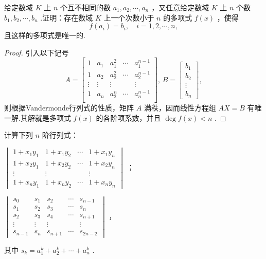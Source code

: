 \begin{prob}[11]
	给定数域 $K$ 上 $n$ 个互不相同的数 $a_1,a_2,\cdots,a_n$ ，又任意给定数域 $K$ 上 $n$ 个数 $b_1,b_2,\cdots,b_n$ .证明：存在数域 $K$ 上一个次数小于 $n$ 的多项式 $f(x)$ ，使得
	\[
		f(a_i)=b_i,\quad i=1,2,\cdots,n,
	\]
	且这样的多项式是唯一的.
\end{prob}
\begin{proof}
	引入以下记号
	\[
		A=\begin{bmatrix}
			1      & a_1    & a_1^2  & \cdots & a_1^{n-1} \\
			1      & a_2    & a_2^2  & \cdots & a_2^{n-1} \\
			\vdots & \vdots & \vdots &        & \vdots    \\
			1      & a_n    & a_2^n  & \cdots & a_n^{n-1} \\
		\end{bmatrix},\,B=\begin{bmatrix}
			b_1 \\b_2\\\vdots\\b_n
		\end{bmatrix},
	\]
	则根据Vandermonde行列式的性质，矩阵 $A$ 满秩，因而线性方程组 $AX=B$ 有唯一解.其解就是多项式 $f(x)$ 的各阶项系数，并且 $\deg f(x)<n$ .
\end{proof}
\begin{prob}[12]
	计算下列 $n$ 阶行列式：
	\begin{mylist}
		\item  $\begin{vmatrix}
				1+x_1y_1 & 1+x_1y_2 & \cdots & 1+x_1y_n \\
				1+x_2y_1 & 1+x_2y_2 & \cdots & 1+x_2y_n \\
				\vdots   & \vdots   &        & \vdots   \\
				1+x_ny_1 & 1+x_ny_2 & \cdots & 1+x_ny_n
			\end{vmatrix}$ ；
		\item  $\begin{vmatrix}
				s_0     & s_1    & s_2     & \cdots & s_{n-1}  \\
				s_1     & s_2    & s_3     & \cdots & s_n      \\
				s_2     & s_3    & s_4     & \cdots & s_{n+1}  \\
				\vdots  & \vdots & \vdots  &        & \vdots   \\
				s_{n-1} & s_n    & s_{n+1} & \cdots & s_{2n-2}
			\end{vmatrix}$ ，\par
		其中 $s_k=a_1^k+a_2^k+\cdots+a_n^k$ .
	\end{mylist}
\end{prob}
